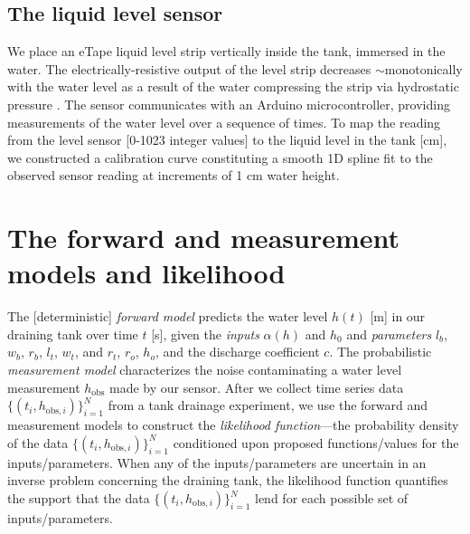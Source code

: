 \documentclass[a4paper,fleqn]{cas-dc}
\newcommand\thedata {$\{(t_i,h_{\text{obs}, i})\}_{i=1}^{N}$\xspace}
\begin{document}
\subsection{The liquid level sensor}
We place an eTape\texttrademark\xspace liquid level strip vertically inside the tank, immersed in the water. 
The electrically-resistive output of the level strip decreases $\sim$monotonically with the water level as a result of the water compressing the strip via hydrostatic pressure \cite{eTape}.
The sensor communicates with an Arduino microcontroller, providing measurements of the water level over a sequence of times. 
To map the reading from the level sensor [0-1023 integer values] to the liquid level in the tank [cm], we constructed a calibration curve constituting a smooth 1D spline fit to the observed sensor reading at increments of 1 cm water height.



\section{The forward and measurement models and likelihood}
The [deterministic] \emph{forward model} predicts the water level $h(t)$ [m] in our draining tank over time $t$ [s], given the \emph{inputs} $\alpha(h)$ and $h_0$ and \emph{parameters}  $l_b$, $w_b$, $r_b$, $l_t$, $w_t$, and $r_t$, $r_o$, $h_o$, and the discharge coefficient $c$. 
The probabilistic \emph{measurement model} characterizes the noise contaminating a water level measurement $h_{\text{obs}}$ made by our sensor.
After we collect time series data \thedata from a tank drainage experiment, we use the forward and measurement models to construct the \emph{likelihood function}---the probability density of the data \thedata conditioned upon proposed functions/values for the inputs/parameters. 
When any of the inputs/parameters are uncertain in an inverse problem concerning the draining tank, the likelihood function quantifies the support that the data \thedata lend for each possible set of inputs/parameters.
\end{document}

